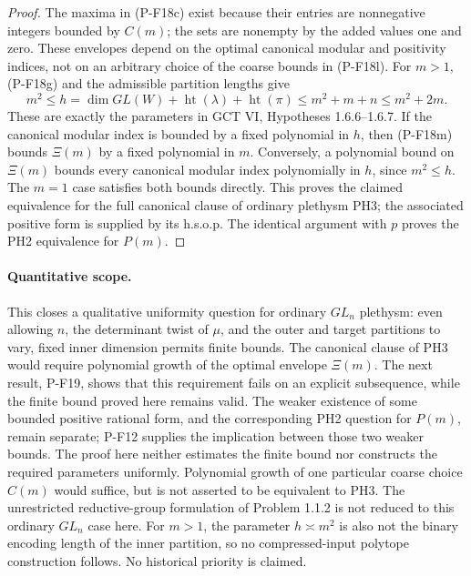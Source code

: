 \begin{proof}
The maxima in (P-F18c) exist because their entries are nonnegative
integers bounded by $C(m)$; the sets are nonempty by the added
values one and zero. These envelopes depend on the optimal
canonical modular and positivity indices, not on an arbitrary
choice of the coarse bounds in (P-F18l).
For $m>1$, (P-F18g) and the admissible partition lengths give
\[
 m^2\le
 h=\dim GL(W)+\operatorname{ht}(\lambda)+\operatorname{ht}(\pi)
 \le m^2+m+n\le m^2+2m.
 \tag{P-F18m}
\]
These are exactly the parameters in GCT VI, Hypotheses 1.6.6--1.6.7.
If the canonical modular index is bounded by a fixed polynomial in
$h$, then (P-F18m) bounds $\Xi(m)$ by a fixed polynomial in $m$.
Conversely, a polynomial bound on $\Xi(m)$ bounds every canonical
modular index polynomially in $h$, since $m^2\le h$.
The $m=1$ case satisfies both bounds directly. This proves the
claimed equivalence for the full canonical clause of ordinary
plethysm PH3; the associated positive form is supplied by its
h.s.o.p. The identical argument with $p$ proves the PH2 equivalence
for $P(m)$.
\end{proof}

\paragraph{Quantitative scope.}
This closes a qualitative uniformity question for ordinary
$GL_n$ plethysm: even allowing $n$, the determinant twist of $\mu$,
and the outer and target partitions to vary, fixed inner dimension
permits finite bounds. The canonical clause of PH3 would require
polynomial growth of the optimal envelope $\Xi(m)$. The next
result, P-F19, shows that this requirement fails on an explicit
subsequence, while the finite bound proved here remains valid.
The weaker existence of some bounded positive rational form, and
the corresponding PH2 question for $P(m)$, remain separate;
P-F12 supplies the implication between those two weaker bounds.
The proof here neither estimates the finite bound nor constructs
the required parameters uniformly. Polynomial growth of one particular coarse choice
$C(m)$ would suffice, but is not asserted to be equivalent to PH3.
The unrestricted reductive-group formulation of Problem 1.1.2 is
not reduced to this ordinary $GL_n$ case here. For $m>1$, the parameter
$h\asymp m^2$ is also not the binary encoding length of the inner
partition, so no compressed-input polytope construction follows.
No historical priority is claimed.
